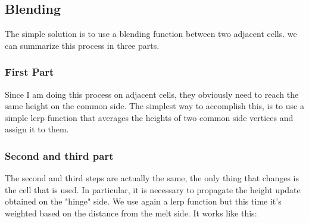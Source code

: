 \newpage

\subsection{Blending}
The simple solution is to use a blending function between two adjacent cells.
we can summarize this process in three parts.

\subsubsection{First Part}

Since I am doing this process on adjacent cells, they obviously need to reach the same height on the common side. The simplest way to accomplish this, is to use a simple lerp function that averages the heights of two common side vertices and assign it to them.

\begin{figure}[hbt!]
	\centering
	\qquad
	\caption{}
\end{figure}

\subsubsection{Second and third part}

The second and third steps are actually the same, the only thing that changes is the cell that is used. In particular, it is necessary to propagate the height update obtained on the "hinge" side. We use again a lerp function but this time it's weighted based on the distance from the melt side. It works like this:

